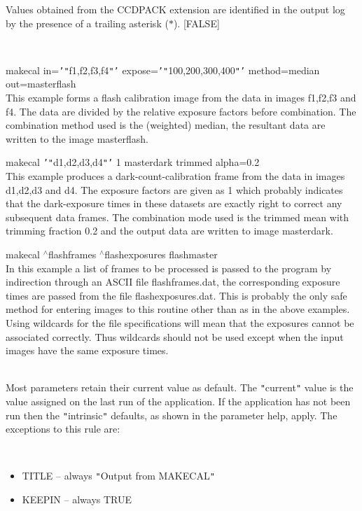 \documentclass[twoside,11pt]{article}
\renewcommand{\_}{\texttt{\symbol{95}}}
\newcommand{\qt}[1]{{\tt "}#1{\tt "}}
\newcommand{\qs}[1]{{\tt '}#1{\tt '}}
\newcommand{\sstexamples}[1]{
   \item[Examples:] \mbox{} \\
   \vspace{-3.5ex}
   \begin{description}
      #1
   \end{description}
}
\newcommand{\sstexamplesubsection}[2]{\sloppy \item{\ssttt #1} \mbox{} \\ #2 }
\newcommand{\sstdiytopic}[2]{\item[#1:] \mbox{} \\[1.3ex] #2}
\newcommand{\sstitemlist}[1]{
  \mbox{} \\
  \vspace{-3.5ex}
  \begin{itemize}
     #1
  \end{itemize}
}
\newcommand{\sstitem}{\item}
\newcommand{\sstexamples}[1]{
      \item[Examples:] \\
      \begin{description}
         #1
      \end{description}
      \\
   }
\newcommand{\sstexamplesubsection}[2]{\item[{\ssttt #1}] #2}
\newcommand{\sstdiytopic}[2]{\item[{#1}] #2 }
\newcommand{\sstitemlist}[1]{
      \begin{itemize}
         #1
      \end{itemize}
      \\
   }
\newcommand{\sstitem}{\item}
\begin{document}
{{{         Values obtained from the CCDPACK extension are identified in
         the output log by the presence of a trailing asterisk ($*$).
         [FALSE]
      }
   }
   \sstexamples{
      \sstexamplesubsection{
         makecal in=\qs{\qt{f1,f2,f3,f4}} expose=\qs{\qt{100,200,300,400}}
                 method=median out=master\_flash
      } {
         This example forms a flash calibration image from the data in
         images f1,f2,f3 and f4. The data are divided by the relative
         exposure factors before combination. The combination method
         used is the (weighted) median, the resultant data are written
         to the image master\_flash.
      }
      \sstexamplesubsection{
         makecal \qs{\qt{d1,d2,d3,d4}} 1 master\_dark trimmed alpha=0.2
      } {
         This example produces a dark-count-calibration frame from the
         data in images d1,d2,d3 and d4. The exposure factors are given
         as 1 which probably indicates that the dark-exposure times in
         these datasets are exactly right to correct any subsequent
         data frames. The combination mode used is the trimmed mean with
         trimming fraction 0.2 and the output data are written to image
         master\_dark.
      }
      \sstexamplesubsection{
         makecal $^\wedge$flash\_frames $^\wedge$flash\_exposures flash\_master
      } {
         In this example a list of frames to be processed is passed to
         the program by indirection through an ASCII file
         flash\_frames.dat, the corresponding exposure times are passed
         from the file flash\_exposures.dat. This is probably the only
         safe method for entering images to this routine other than as in
         the above examples. Using wildcards for the file
         specifications will mean that the exposures cannot be
         associated correctly. Thus wildcards should not be used except
         when the input images have the same exposure times.
      }
   }
   \sstdiytopic{
      Behaviour of parameters
   } {
      Most parameters retain their current value as default. The
      \qt{current} value is the value assigned on the last run of the
      application. If the application has not been run then the
      \qt{intrinsic} defaults, as shown in the parameter help, apply.
      The exceptions to this rule are:
      \sstitemlist{

         \sstitem
            TITLE  -- always \qt{Output from MAKECAL}

         \sstitem
            KEEPIN -- always TRUE

}}}
\end{document}
